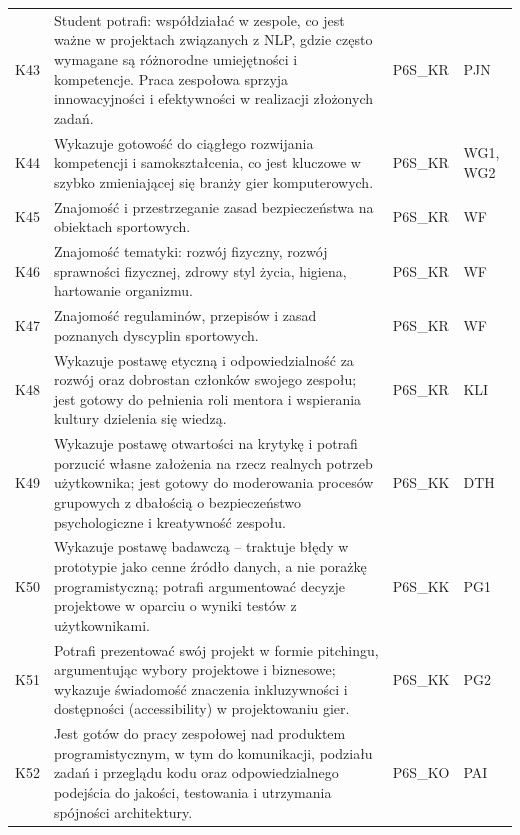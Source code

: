 \documentclass[12pt,a4paper]{article}
\begin{document}
{\begin{longtable}{m{1cm}m{8.8cm}m{2.1cm}m{2.5cm}}
\rowcolor{tableRowLight} K43 & Student potrafi: współdziałać w zespole, co jest ważne w projektach związanych z NLP, gdzie często wymagane są różnorodne umiejętności i kompetencje. Praca zespołowa sprzyja innowacyjności i efektywności w realizacji złożonych zadań. & {\scriptsize P6S\_KR} & {\scriptsize PJN} \\
\rowcolor{tableRowAlt} K44 & Wykazuje gotowość do ciągłego rozwijania kompetencji i samokształcenia, co jest kluczowe w szybko zmieniającej się branży gier komputerowych. & {\scriptsize P6S\_KR} & {\scriptsize WG1, WG2} \\
\rowcolor{tableRowLight} K45 & Znajomość i przestrzeganie zasad bezpieczeństwa na obiektach sportowych. & {\scriptsize P6S\_KR} & {\scriptsize WF} \\
\rowcolor{tableRowAlt} K46 & Znajomość tematyki: rozwój fizyczny, rozwój sprawności fizycznej, zdrowy styl życia, higiena, hartowanie organizmu. & {\scriptsize P6S\_KR} & {\scriptsize WF} \\
\rowcolor{tableRowLight} K47 & Znajomość regulaminów, przepisów i zasad poznanych dyscyplin sportowych. & {\scriptsize P6S\_KR} & {\scriptsize WF} \\
\rowcolor{tableRowAlt} K48 & Wykazuje postawę etyczną i odpowiedzialność za rozwój oraz dobrostan członków swojego zespołu; jest gotowy do pełnienia roli mentora i wspierania kultury dzielenia się wiedzą. & {\scriptsize P6S\_KR} & {\scriptsize KLI} \\
\rowcolor{tableRowLight} K49 & Wykazuje postawę otwartości na krytykę i potrafi porzucić własne założenia na rzecz realnych potrzeb użytkownika; jest gotowy do moderowania procesów grupowych z dbałością o bezpieczeństwo psychologiczne i kreatywność zespołu. & {\scriptsize P6S\_KK} & {\scriptsize DTH} \\
\rowcolor{tableRowAlt} K50 & Wykazuje postawę badawczą -- traktuje błędy w prototypie jako cenne źródło danych, a nie porażkę programistyczną; potrafi argumentować decyzje projektowe w oparciu o wyniki testów z użytkownikami. & {\scriptsize P6S\_KK} & {\scriptsize PG1} \\
\rowcolor{tableRowLight} K51 & Potrafi prezentować swój projekt w formie pitchingu, argumentując wybory projektowe i biznesowe; wykazuje świadomość znaczenia inkluzywności i dostępności (accessibility) w projektowaniu gier. & {\scriptsize P6S\_KK} & {\scriptsize PG2} \\
\rowcolor{tableRowAlt} K52 & Jest gotów do pracy zespołowej nad produktem programistycznym, w tym do komunikacji, podziału zadań i przeglądu kodu oraz odpowiedzialnego podejścia do jakości, testowania i utrzymania spójności architektury. & {\scriptsize P6S\_KO} & {\scriptsize PAI} \\

\end{longtable}}
\end{document}
